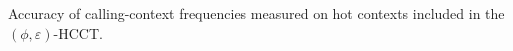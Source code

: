 \label{fig:hcct-counters} Accuracy of calling-context frequencies measured on hot contexts included in the $(\phi,\varepsilon)$-HCCT.